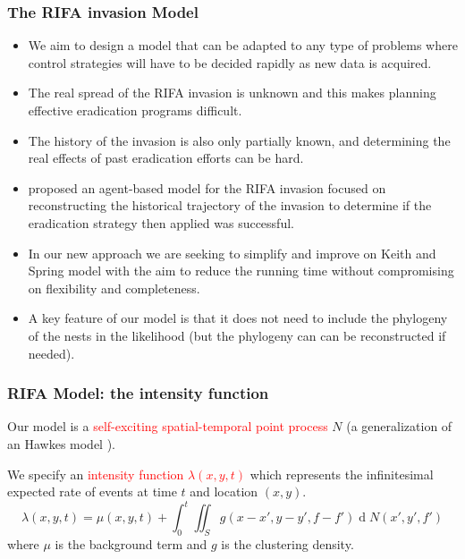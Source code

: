 \documentclass[9pt, xcolor={dvipsnames,svgnames,table}]{beamer}
\renewcommand{\d}[1]{\ensuremath{\operatorname{d}\!{#1}}}
\begin{document}
\begin{frame}
    \frametitle{The RIFA invasion Model}
    \begin{itemize}
        \item We aim to design a \textcolor{PineGreen}{model that can be adapted to any type of problems where control strategies will have to be decided rapidly as new data is acquired}.
        \item  \textcolor{PineGreen}{The real spread of the RIFA invasion is unknown} and this makes planning effective eradication programs difficult.
        \item \textcolor{PineGreen}{The history of the invasion is also only partially known}, and determining the real effects of past eradication efforts can be hard.
        \item \cite{Keith} proposed an agent-based model for the RIFA invasion focused on reconstructing the historical trajectory of the invasion to determine if the eradication strategy then applied was successful.
        \item In our new approach we are seeking to \textcolor{PineGreen}{simplify and improve on Keith and Spring model} with the aim to reduce the running time without compromising on flexibility and completeness.
        \item A key feature of our model is that \textcolor{PineGreen}{it does not need to include the phylogeny of the nests in the likelihood} (but the phylogeny can can be reconstructed if needed).
    \end{itemize}
\end{frame}





\begin{frame}
    \frametitle{RIFA Model: the intensity function}
    Our model is a \textcolor{Red}{self-exciting spatial-temporal point process} $N$ (a generalization of an Hawkes model \cite{Hawkes71}). 
    
    We specify an \textcolor{Red}{intensity function $\lambda(x, y, t)$} which represents the infinitesimal expected  rate of events at time $t$ and location $(x, y)$.
    \begin{equation*}
        \lambda(x, y, t) = \mu(x, y, t) + \int_{0}^{t} \iint_{S} g(x - x', y - y', f - f') \d N(x', y', f')
    \end{equation*}
    where $\mu$ is the background term and $g$ is the clustering density.
\end{frame}
\end{document}
